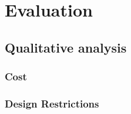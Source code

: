 \chapter{Evaluation}
\label{chap:eval}


\section{Qualitative analysis}
\subsection{Cost}






\subsection{Design Restrictions} %




